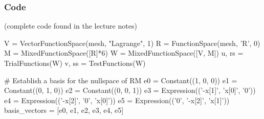 \begin{frame}[fragile]
\frametitle{Code}
(complete code found in the lecture notes)
\begin{python}
V = VectorFunctionSpace(mesh, "Lagrange", 1)
R = FunctionSpace(mesh, 'R', 0)      
M = MixedFunctionSpace([R]*6)      
W = MixedFunctionSpace([V, M])
u, rs = TrialFunctions(W)
v, ss = TestFunctions(W)

# Establish a basis for the nullspace of RM
e0 = Constant((1, 0, 0))	
e1 = Constant((0, 1, 0))
e2 = Constant((0, 0, 1))
e3 = Expression(('-x[1]', 'x[0]', '0')) 
e4 = Expression(('-x[2]', '0', 'x[0]'))
e5 = Expression(('0', '-x[2]', 'x[1]'))
basis_vectors = [e0, e1, e2, e3, e4, e5]
\end{python}
\end{frame}
